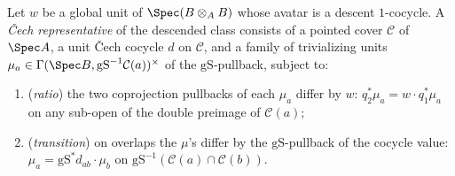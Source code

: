 \begin{definition}
  \label{pa-def:DescentClassRep}
  \leanok

  Let \(w\) be a global unit of \(\Spec(B \otimes_A B)\) whose avatar is a descent
  \(1\)-cocycle.  A \emph{\v Cech representative} of the descended class consists of a pointed
  cover \(\mathcal C\) of \(\Spec A\), a unit \v Cech cocycle \(d\) on \(\mathcal C\), and a
  family of trivializing units \(\mu_a \in \Gamma(\Spec B, \mathrm{gS}^{-1}\mathcal
  C(a))^{\times}\) of the \(\mathrm{gS}\)-pullback, subject to:
  \begin{enumerate}
    \item (\emph{ratio}) the two coprojection pullbacks of each \(\mu_a\) differ by \(w\):
      \(q_2^{*}\mu_a = w \cdot q_1^{*}\mu_a\) on any sub-open of the double preimage of
      \(\mathcal C(a)\);
    \item (\emph{transition}) on overlaps the \(\mu\)'s differ by the \(\mathrm{gS}\)-pullback
      of the cocycle value: \(\mu_a = \mathrm{gS}^{*} d_{ab} \cdot \mu_b\) on \(\mathrm{gS}^{-1}
      (\mathcal C(a) \cap \mathcal C(b))\).
  \end{enumerate}
\end{definition}

